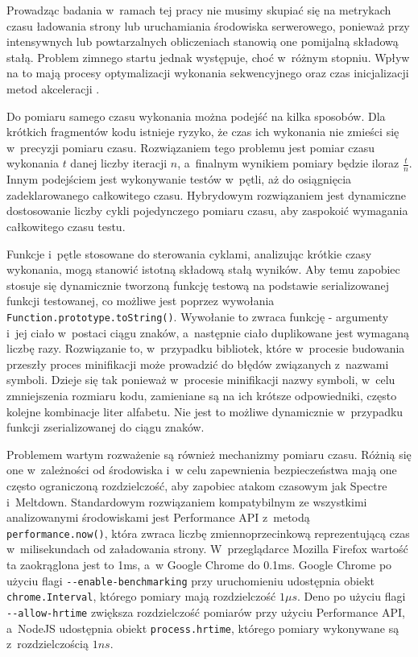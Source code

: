 Prowadząc badania w~ramach tej pracy nie musimy skupiać się na metrykach czasu ładowania strony lub uruchamiania środowiska serwerowego, ponieważ przy intensywnych lub powtarzalnych obliczeniach stanowią one pomijalną składową stałą.
Problem zimnego startu jednak występuje, choć w~różnym stopniu. Wpływ na to mają procesy optymalizacji wykonania sekwencyjnego oraz czas inicjalizacji metod akceleracji \cite{je-benchmarking}.

Do pomiaru samego czasu wykonania można podejść na kilka sposobów. Dla krótkich fragmentów kodu istnieje ryzyko, że czas ich wykonania nie zmieści się w~precyzji pomiaru czasu. Rozwiązaniem tego problemu jest pomiar czasu wykonania $t$ danej liczby iteracji $n$, a~finalnym wynikiem pomiary będzie iloraz $\frac{t}{n}$. Innym podejściem jest wykonywanie testów w~pętli, aż do osiągnięcia zadeklarowanego całkowitego czasu. Hybrydowym rozwiązaniem jest dynamiczne dostosowanie liczby cykli pojedynczego pomiaru czasu, aby zaspokoić wymagania całkowitego czasu testu.

Funkcje i~pętle stosowane do sterowania cyklami, analizując krótkie czasy wykonania, mogą stanowić istotną składową stałą wyników. Aby temu zapobiec stosuje się dynamicznie tworzoną funkcję testową na podstawie serializowanej funkcji testowanej, co możliwe jest poprzez wywołania \lstinline{Function.prototype.toString()}. Wywołanie to zwraca funkcję - argumenty i~jej ciało w~postaci ciągu znaków, a~następnie ciało duplikowane jest wymaganą liczbę razy. Rozwiązanie to, w~przypadku bibliotek, które w~procesie budowania przeszły proces minifikacji może prowadzić do błędów związanych z~nazwami symboli. Dzieje się tak ponieważ w~procesie minifikacji nazwy symboli, w~celu zmniejszenia rozmiaru kodu, zamieniane są na ich krótsze odpowiedniki, często kolejne kombinacje liter alfabetu. Nie jest to możliwe dynamicznie w~przypadku funkcji zserializowanej do ciągu znaków.

Problemem wartym rozważenie są również mechanizmy pomiaru czasu. Różnią się one w~zależności od środowiska i~w celu zapewnienia bezpieczeństwa mają one często ograniczoną rozdzielczość, aby zapobiec atakom czasowym jak Spectre i~Meltdown. Standardowym rozwiązaniem kompatybilnym ze wszystkimi analizowanymi środowiskami jest Performance API z~metodą \lstinline{performance.now()}, która zwraca liczbę zmiennoprzecinkową reprezentującą czas w~milisekundach od załadowania strony. W~przeglądarce Mozilla Firefox wartość ta zaokrąglona jest to 1ms, a~w Google Chrome do 0.1ms. Google Chrome po użyciu flagi \mbox{\lstinline{--enable-benchmarking}} przy uruchomieniu udostępnia obiekt \lstinline{chrome.Interval}, którego pomiary mają rozdzielczość $1 {\mu}s$. Deno po użyciu flagi \lstinline{--allow-hrtime} zwiększa rozdzielczość pomiarów przy użyciu Performance API, a~NodeJS udostępnia obiekt \lstinline{process.hrtime}, którego pomiary wykonywane są z~rozdzielczością $1ns$.

